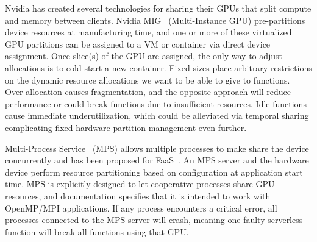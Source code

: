 Nvidia has created several technologies for sharing their GPUs that split compute and memory between clients.
Nvidia MIG~\cite{nvidia-mig} (Multi-Instance GPU) pre-partitions device resources at  manufacturing time, and one or more of these virtualized GPU partitions can be assigned to a VM or container via direct device assignment.
Once slice(s) of the GPU are assigned, the only way to adjust allocations is to cold start a new container.
Fixed sizes place arbitrary restrictions on the dynamic resource allocations we want to be able to give to functions.
Over-allocation causes fragmentation, and the opposite approach will reduce performance or could break functions due to insufficient resources.
Idle functions cause immediate underutilization, which could be alleviated via temporal sharing complicating fixed hardware partition management even further.

Multi-Process Service~\cite{nvidia-mps} (MPS) allows multiple processes to make share the device concurrently and has been proposed for FaaS~\cite{gu2023fast}.
An MPS server and the hardware device perform resource partitioning based on configuration at application start time.
MPS is explicitly designed to let cooperative processes share GPU resources, and documentation specifies that it is intended to work with OpenMP/MPI applications.
If any process encounters a critical error, all processes connected to the MPS server will crash, meaning one faulty serverless function will break all functions using that GPU.%


